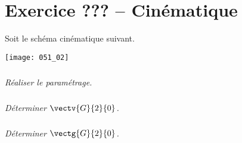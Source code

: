 \section*{Exercice ??? -- Cinématique}
\setcounter{exo}{0}

Soit le schéma cinématique suivant.
\begin{center}
\texttt{[image: 051\_02]}
\end{center}


\subparagraph{}
\textit{Réaliser le paramétrage.}


\subparagraph{}
\textit{Déterminer $\vectv{G}{2}{0}$.}


\subparagraph{}
\textit{Déterminer $\vectg{G}{2}{0}$.}


